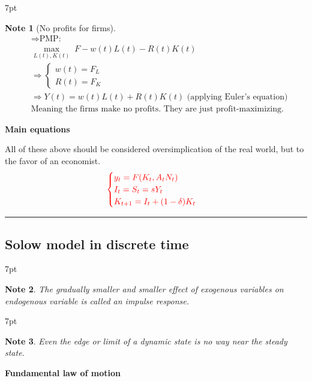 \documentclass{article}
\newcommand*\sepline{%
  \begin{center}
    \rule[1ex]{.5\textwidth}{.5pt}
  \end{center}}
\newenvironment{blueblock}{
\def\FrameCommand{
  \hspace{1pt}
    {\color{DarkBlue}
    \vrule width 2pt}
    {\color{blueshade}
    \vrule width 4pt}
  \colorbox{blueshade}
}
\MakeFramed{
  \advance
  \hsize-
  \width
  \FrameRestore}
\noindent\hspace{-4.55pt}%
\begin{adjustwidth}{}{7pt}
\vspace{2pt}\vspace{2pt}
}
{\vspace{2pt}\end{adjustwidth}\endMakeFramed}
\newtheorem{note}{Note}
\begin{document}
\begin{blueblock}
\begin{note}[No profits for firms]
\begin{align}
&\Rightarrow \text{PMP:}
\\& \mathop{max}_{L(t),K(t)} \; F-w(t)L(t)-R(t)K(t)
\\&\Rightarrow \begin{cases}
w(t)=F_{L} \\
R(t)=F_{K}\end{cases}
\\&\Rightarrow Y(t)=w(t)L(t)+R(t)K(t) \text{ (applying Euler's equation)}
\\& \text{Meaning the firms make no profits. They are just profit-maximizing.}
\end{align}
\end{note}
\end{blueblock}

\textbf{Main equations} 

All of these above should be considered oversimplication of the real world, but to the favor of an economist. 
\begin{align}
\color{red}
\begin{cases}
y_{t}=F(K_{t},A_{t}N_{t}) \\
I_{t}=S_{t}=sY_{t} \\
K_{t+1}=I_{t}+(1-\delta)K_{t}\end{cases}
\end{align}


\sepline
\subsection{Solow model in discrete
time}\label{solow-model-in-discrete-time}


\begin{blueblock}
\begin{note}
The gradually smaller and smaller effect of exogenous variables on endogenous variable is called an impulse response.
\end{note}
\end{blueblock}

\begin{blueblock}
\begin{note}
Even the edge or limit of a dynamic state is no way near the steady state.
\end{note}
\end{blueblock}


\textbf{Fundamental law of motion} 
\end{document}
